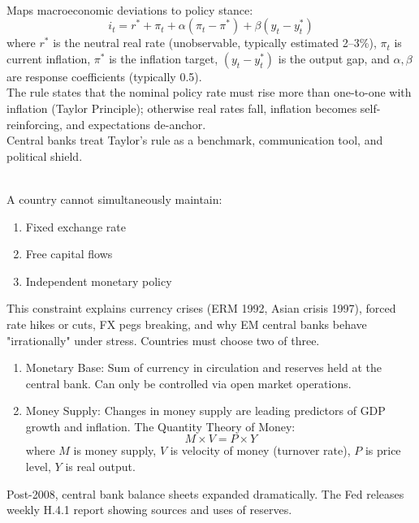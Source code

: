 \begin{remark} \\
Maps macroeconomic deviations to policy stance:
\begin{equation*}
i_t = r^* + \pi_t + \alpha (\pi_t - \pi^*) + \beta (y_t - y_t^*)
\end{equation*}
where $r^*$ is the neutral real rate (unobservable, typically estimated 2--3\%), $\pi_t$ is current inflation, $\pi^*$ is the inflation target, $(y_t - y_t^*)$ is the output gap, and $\alpha, \beta$ are response coefficients (typically 0.5).\\
The rule states that the nominal policy rate must rise more than one-to-one with inflation (Taylor Principle); otherwise real rates fall, inflation becomes self-reinforcing, and expectations de-anchor.\\
Central banks treat Taylor's rule as a benchmark, communication tool, and political shield.
\end{remark}

\begin{remark} \\
A country cannot simultaneously maintain:
\begin{enumerate}[label=\roman*.]
\setlength{\itemsep}{0pt}
\item Fixed exchange rate
\item Free capital flows
\item Independent monetary policy
\end{enumerate}
This constraint explains currency crises (ERM 1992, Asian crisis 1997), forced rate hikes or cuts, FX pegs breaking, and why EM central banks behave "irrationally" under stress. Countries must choose two of three.
\end{remark}

\begin{remark} 
\begin{enumerate}[label=\roman*.]
\setlength{\itemsep}{0pt}
\item Monetary Base: Sum of currency in circulation and reserves held at the central bank. Can only be controlled via open market operations.
\item Money Supply: Changes in money supply are leading predictors of GDP growth and inflation. The Quantity Theory of Money:
\begin{equation*}
M \times V = P \times Y
\end{equation*}
where $M$ is money supply, $V$ is velocity of money (turnover rate), $P$ is price level, $Y$ is real output.
\end{enumerate}
Post-2008, central bank balance sheets expanded dramatically. The Fed releases weekly H.4.1 report showing sources and uses of reserves.
\end{remark}

